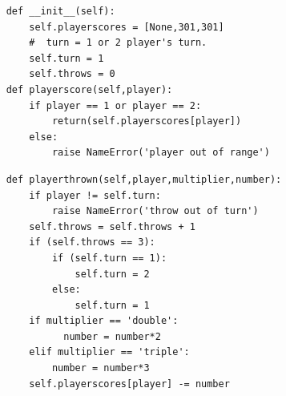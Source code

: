 \documentclass{beamer}
\begin{document}
\begin{frame}[fragile]
\begin{lstlisting}
    def __init__(self):
        self.playerscores = [None,301,301]
        #  turn = 1 or 2 player's turn.    
        self.turn = 1
        self.throws = 0
    def playerscore(self,player):
        if player == 1 or player == 2:
            return(self.playerscores[player])
        else:
            raise NameError('player out of range')
\end{lstlisting}
\end{frame}
\begin{frame}[fragile]
  

\begin{lstlisting}
    def playerthrown(self,player,multiplier,number):
        if player != self.turn:
            raise NameError('throw out of turn')
        self.throws = self.throws + 1
        if (self.throws == 3):
            if (self.turn == 1):
                self.turn = 2
            else:
                self.turn = 1
        if multiplier == 'double':
              number = number*2
        elif multiplier == 'triple':
            number = number*3
        self.playerscores[player] -= number
\end{lstlisting}
  
\end{frame}
\end{document}
